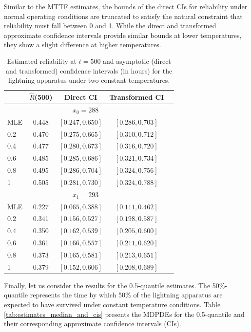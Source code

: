 \documentclass{article}
\begin{document}
Similar to the MTTF estimates, the bounds of the direct CIs for reliability under normal operating conditions are truncated to satisfy the natural constraint that reliability must fall between 0 and 1. While the direct and transformed approximate confidence intervals provide similar bounds at lower temperatures, they show a slight difference at higher temperatures.
%
\begin{table}[h]
\centering
\caption{Estimated reliability at $t=500$ and asymptotic (direct and transformed) confidence intervals (in hours) for the lightning apparatus under two  constant temperatures.}
\label{tab:estimates_survival_and_cis}
\begin{tabular}{lcccc}
\toprule
& $\hat{R}$(500) & Direct CI & Transformed CI \\
\midrule
\multicolumn{4}{c}{$x_0 = 288$} \\
\midrule
MLE & 0.448 & $[0.247, 0.650]$ & $[0.286, 0.703]$ \\
0.2 & 0.470 & $[0.275, 0.665]$ & $[0.310, 0.712]$ \\
0.4 & 0.477 & $[0.280, 0.673]$ & $[0.316, 0.720]$ \\
0.6 & 0.485 & $[0.285, 0.686]$ & $[0.321, 0.734]$ \\
0.8 & 0.495 & $[0.286, 0.704]$ & $[0.324, 0.756]$ \\
1 & 0.505 & $[0.281, 0.730]$ & $[0.324, 0.788]$ \\
\midrule
\multicolumn{4}{c}{$x_1 = 293$} \\
\midrule
MLE & 0.227 & $[0.065, 0.388]$ & $[0.111, 0.462]$ \\
0.2 & 0.341 & $[0.156, 0.527]$ & $[0.198, 0.587]$ \\
0.4 & 0.350 & $[0.162, 0.539]$ & $[0.205, 0.600]$ \\
0.6 & 0.361 & $[0.166, 0.557]$ & $[0.211, 0.620]$ \\
0.8 & 0.373 & $[0.165, 0.581]$ & $[0.213, 0.651]$ \\
1 & 0.379 & $[0.152, 0.606]$ & $[0.208, 0.689]$ \\
\bottomrule
\end{tabular}
\end{table}

Finally, let us consider the results for the 0.5-quantile estimates. The 50\%-quantile represents the time by which 50\% of the lightning apparatus are expected to have survived under constant temperature conditions. Table \ref{tab:estimates_median_and_cis} presents the MDPDEs for the 0.5-quantile and their corresponding approximate confidence intervals (CIs).
\end{document}
